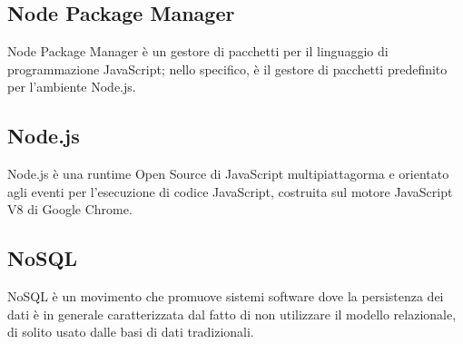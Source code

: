 
\subsection*{Node Package Manager}
Node Package Manager è un gestore di pacchetti per il linguaggio di programmazione JavaScript; nello specifico, è il gestore di pacchetti predefinito per l'ambiente Node.js.

\subsection*{Node.js}
Node.js è una runtime Open Source di JavaScript multipiattagorma e orientato agli eventi per l'esecuzione di codice JavaScript, costruita sul motore JavaScript V8 di Google Chrome.

\subsection*{NoSQL}
NoSQL è un movimento che promuove sistemi software dove la persistenza dei dati è in generale caratterizzata dal fatto di non utilizzare il modello relazionale, di solito usato dalle basi di dati tradizionali.

